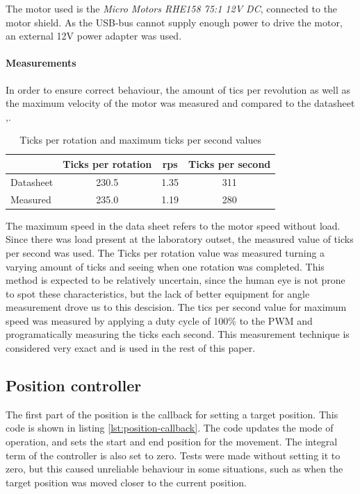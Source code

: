 \documentclass[11pt]{article}
\begin{document}
The motor used is the \emph{Micro Motors RHE158 75:1 12V DC}, connected to the motor shield. As the USB-bus cannot supply enough power to drive the motor, an external 12V power adapter was used.
\paragraph{Measurements}
In order to ensure correct behaviour, the amount of tics per revolution as well as the maximum velocity of the motor was measured and compared to the datasheet \cite{datasheet_motor_1},\cite{datasheet_motor_2}.
\begin{table}[!htbp]
  \centering
  \caption{Ticks per rotation and maximum ticks per second values}
  \begin{tabular}{l|ccc}
    & Ticks per rotation & rps & Ticks per second\\ \hline
    Datasheet & 230.5 & 1.35 & 311\\
    Measured & 235.0 & 1.19 & 280
  \end{tabular}
  \label{tab:measurements}
\end{table}
The maximum speed in the data sheet refers to the motor speed without load. Since there was load present at the laboratory outset, the measured value of ticks per second was used. The Ticks per rotation value was measured turning a varying amount of ticks and seeing when one rotation was completed. This method is expected to be relatively uncertain, since the human eye is not prone to spot these characteristics, but the lack of better equipment for angle measurement drove us to this descision. The tics per second value for maximum speed was measured by applying a duty cycle of 100\% to the PWM and programatically measuring the ticks each second. This measurement technique is considered very exact and is used in the rest of this paper.

\subsection{Position controller}
The first part of the position is the callback for setting a target position. This code is shown in listing \vref{lst:position-callback}. The code updates the mode of operation, and sets the start and end position for the movement. The integral term of the controller is also set to zero. Tests were made without setting it to zero, but this caused unreliable behaviour in some situations, such as when the target position was moved closer to the current position. \par
\end{document}
